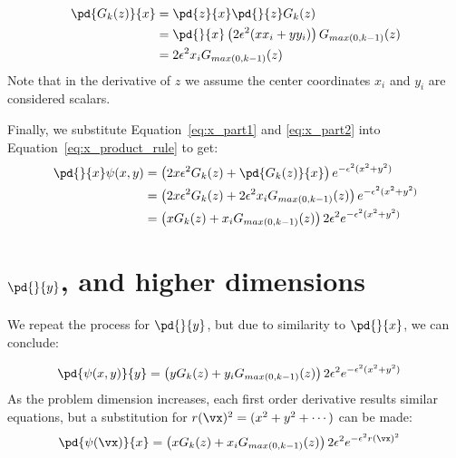 \documentclass[11pt]{report}
\begin{document}
{%

\begin{align}
\pd{G_k(z)}{x} & = \pd{z}{x} \pd{}{z} G_k(z) \nonumber \\
               & = \pd{}{x} \left( 2\epsilon^2(x x_i + y y_i) \right) G_{max(0,k-1)}(z) \nonumber \\ 
               & = 2 \epsilon^2 x_i G_{max(0,k-1)}( z ) \label{eq:x_part2}
\end{align}
Note that in the derivative of $z$ we assume the center coordinates $x_i$ and $y_i$ are considered scalars. 


Finally, we substitute Equation~\ref{eq:x_part1} and \ref{eq:x_part2} into Equation~\ref{eq:x_product_rule} to get:
\begin{align}
\pd{}{x}\psi(x,y) & = \left( 2x\epsilon^2 G_k(z) + \pd{G_k(z)}{x} \right) e^{-\epsilon^2(x^2 + y^2)} \nonumber \\
                 & = \left( 2x\epsilon^2 G_k(z) + 2 \epsilon^2 x_i G_{max(0,k-1)}( z )  \right) e^{-\epsilon^2(x^2 + y^2)}  \nonumber \\
                 & = \left( x G_{k}(z) + x_i G_{max(0,k-1)}(z) \right) 2 \epsilon^2 e^{-\epsilon^2(x^2+y^2)}\label{eq:rbf_ga_xderiv}
\end{align}


\section{$\pd{}{y}$, and higher dimensions}

We repeat the process for $\pd{}{y}$, but due to similarity to $\pd{}{x}$, we can conclude: 

\begin{align}
\pd{\psi(x,y)}{y}   & = \left( y G_k(z) + y_i G_{max(0,k-1)}( z )  \right) 2\epsilon^2 e^{-\epsilon^2(x^2 + y^2)} \label{eq:rbf_ga_yderiv}
\end{align}
As the problem dimension increases, each first order derivative results similar equations, but a substitution for $r(\vx)^2 = (x^2 + y^2 + \cdots)$ can be made: 
\begin{align}
\pd{\psi(\vx)}{x}   & = \left( x G_k(z) + x_i G_{max(0,k-1)}( z )  \right) 2\epsilon^2 e^{-\epsilon^2 r(\vx)^2} \label{eq:rbf_ga_yderiv}
\end{align}


}
\end{document}
